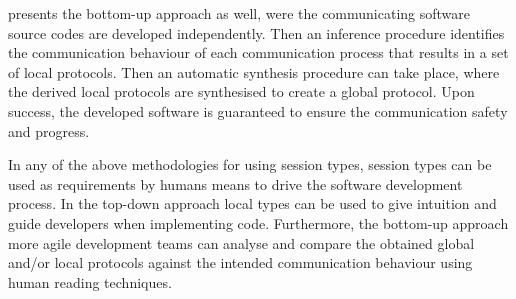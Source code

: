 presents the bottom-up approach as well,
were the communicating 
software source codes
are developed independently.
Then an inference  procedure identifies the communication behaviour
of each
communication process that results in a set of local protocols.
Then an automatic synthesis procedure can take place,
where the derived local protocols are synthesised
to create a global protocol. Upon success, the
developed software is guaranteed to ensure
the communication safety and progress.


In any of the above methodologies for using session types,
session types can be used as requirements by humans means
to drive the software development process. In the top-down
approach local types can be used to give intuition and guide
developers when implementing code.
Furthermore, the bottom-up approach more agile development teams
can analyse and compare the obtained global and/or local protocols
against the intended communication behaviour using human
reading techniques.







